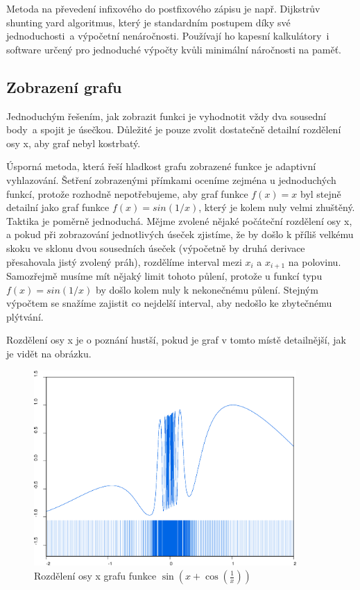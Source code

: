 \documentclass[11pt]{article}
\begin{document}
Metoda na převedení infixového do postfixového zápisu je např. Dijkstrův
shunting yard algoritmus\cite{wikiShunting}\cite{shewchuk}, který je
standardním postupem díky své jednoduchosti~a výpočetní nenáročnosti. Používají
ho kapesní kalkulátory~i software určený pro jednoduché výpočty kvůli minimální
náročnosti na paměť.



\subsection{Zobrazení grafu}
Jednoduchým řešením, jak zobrazit funkci je vyhodnotit vždy dva sousední body~a
spojit je úsečkou. Důležité je pouze zvolit dostatečně detailní rozdělení osy
x, aby graf nebyl kostrbatý.

Úsporná metoda, která řeší hladkost grafu zobrazené funkce je adaptivní
vyhlazování. Šetření zobrazenými přímkami oceníme zejména u jednoduchých
funkcí, protože rozhodně nepotřebujeme, aby graf funkce $f(x) = x$ byl stejně
detailní jako graf funkce $f(x) = sin(1/x)$, který je kolem nuly velmi
zhuštěný. Taktika je poměrně jednoduchá. Mějme zvolené nějaké počáteční
rozdělení osy x, a pokud při zobrazování jednotlivých úseček zjistíme, že by
došlo k příliš velkému skoku ve sklonu dvou sousedních úseček (výpočetně by
druhá derivace přesahovala jistý zvolený práh), rozdělíme interval mezi $x_i$
a $x_{i + 1}$ na polovinu. Samozřejmě musíme mít nějaký limit tohoto půlení,
protože u funkcí typu $f(x) = sin(1/x)$ by došlo kolem nuly k nekonečnému
půlení. Stejným výpočtem se snažíme zajistit co nejdelší interval, aby nedošlo
ke zbytečnému plýtvání. 

Rozdělení osy x je o poznání hustší, pokud je graf v tomto místě detailnější,
jak je vidět na obrázku.

\begin{figure}[ht!]
\centering
	\includegraphics[width=10cm]{figures/density.eps}
	\caption{Rozdělení osy x grafu funkce
		$\sin \left(x + \cos \left(\frac{1}{x} \right) \right)$}
\end{figure}
\end{document}
